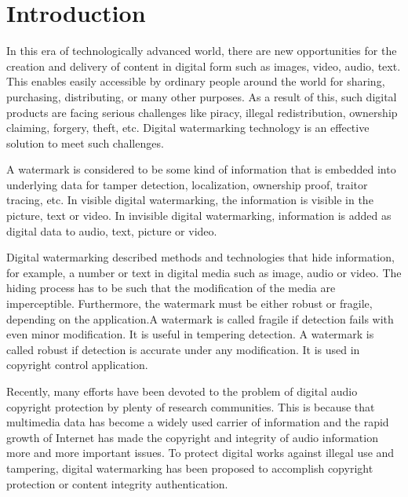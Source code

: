\documentclass[12pt,a4paper]{article}
\begin{document}


\setcounter{section}{6}
\setcounter{page}{1}


\section{Introduction}


In this era of technologically advanced world, there are new opportunities for the creation and delivery of content in digital form such as images, video, audio, text. This enables easily accessible by ordinary people around the world for sharing, purchasing, distributing, or many other purposes. As a result of this, such digital products are facing serious challenges like piracy, illegal redistribution, ownership claiming, forgery, theft, etc. Digital watermarking technology is an effective solution to meet such challenges.

\bigskip

A watermark is considered to be some kind of information that is embedded into underlying data for tamper detection, localization, ownership proof, traitor tracing, etc. In visible digital watermarking, the information is visible in the picture, text or video. In invisible digital watermarking, information is added as digital data to audio, text, picture or video.

\bigskip

Digital watermarking described methods and technologies that hide information, for example, a number or text in digital media such as image, audio or video. The hiding process has to be such that the modification of the media are imperceptible. Furthermore, the watermark must be either robust or fragile, depending on the application.A watermark is called fragile if detection fails with even minor modification. It is useful in tempering detection. A watermark is called robust if detection is accurate under any modification. It is used in copyright control application.

\bigskip

Recently, many efforts have been devoted to the problem of digital audio copyright protection by plenty of research communities. This is because that multimedia data has become a widely used carrier of information and the rapid growth of Internet has made the copyright and integrity of audio information more and more important issues. To protect digital works against illegal use and tampering, digital watermarking has been proposed to accomplish copyright protection or content
integrity authentication.
\end{document}
